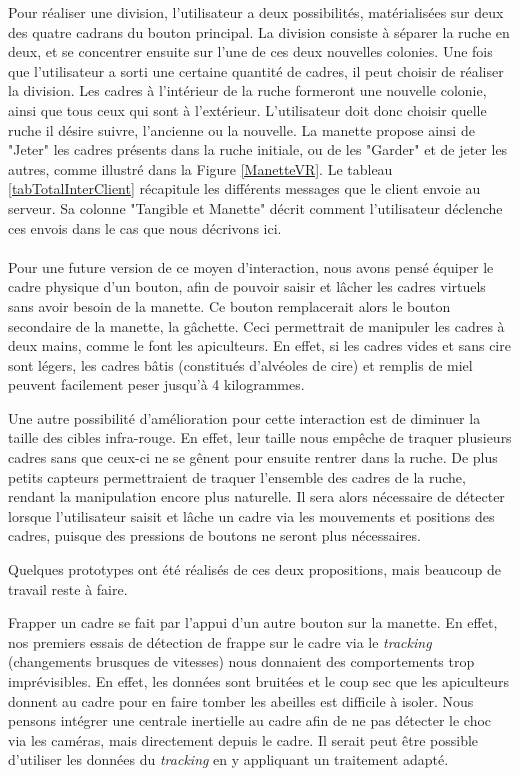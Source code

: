 		Pour réaliser une division, l'utilisateur a deux possibilités, matérialisées sur deux des quatre cadrans du bouton principal. La division consiste à séparer la ruche en deux, et se concentrer ensuite sur l'une de ces deux nouvelles colonies. Une fois que l'utilisateur a sorti une certaine quantité de cadres, il peut choisir de réaliser la division. Les cadres à l'intérieur de la ruche formeront une nouvelle colonie, ainsi que tous ceux qui sont à l'extérieur. L'utilisateur doit donc choisir quelle ruche il désire suivre, l'ancienne ou la nouvelle. La manette propose ainsi de "Jeter" les cadres présents dans la ruche initiale, ou de les "Garder" et de jeter les autres, comme illustré dans la Figure \ref{ManetteVR}. Le tableau \ref{tabTotalInterClient} récapitule les différents messages que le client envoie au serveur. Sa colonne "Tangible et Manette" décrit comment l'utilisateur déclenche ces envois dans le cas que nous décrivons ici.

		\paragraph{}		
		Pour une future version de ce moyen d'interaction, nous avons pensé équiper le cadre physique d'un bouton, afin de pouvoir saisir et lâcher les cadres virtuels sans avoir besoin de la manette. Ce bouton remplacerait alors le bouton secondaire de la manette, la gâchette. Ceci permettrait de manipuler les cadres à deux mains, comme le font les apiculteurs. En effet, si les cadres vides et sans cire sont légers, les cadres bâtis (constitués d'alvéoles de cire) et remplis de miel peuvent facilement peser jusqu'à 4 kilogrammes.
		
		Une autre possibilité d'amélioration pour cette interaction est de diminuer la taille des cibles infra-rouge. En effet, leur taille nous empêche de traquer plusieurs cadres sans que ceux-ci ne se gênent pour ensuite rentrer dans la ruche. De plus petits capteurs permettraient de traquer l'ensemble des cadres de la ruche, rendant la manipulation encore plus naturelle. Il sera alors nécessaire de détecter lorsque l'utilisateur saisit et lâche un cadre via les mouvements et positions des cadres, puisque des pressions de boutons ne seront plus nécessaires.
		
		Quelques prototypes ont été réalisés de ces deux propositions, mais beaucoup de travail reste à faire.
		
		Frapper un cadre se fait par l'appui d'un autre bouton sur la manette. En effet, nos premiers essais de détection de frappe sur le cadre via le \textit{tracking} (changements brusques de vitesses) nous donnaient des comportements trop imprévisibles. En effet, les données sont bruitées et le coup sec que les apiculteurs donnent au cadre pour en faire tomber les abeilles est difficile à isoler. Nous pensons intégrer une centrale inertielle au cadre afin de ne pas détecter le choc via les caméras, mais directement depuis le cadre. Il serait peut être possible d'utiliser les données du \textit{tracking} en y appliquant un traitement adapté.
		
